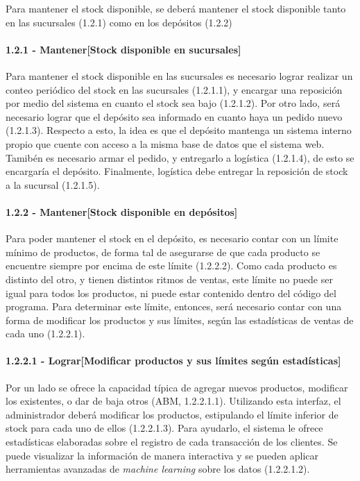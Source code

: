 Para mantener el stock disponible, se deberá mantener el stock disponible tanto
en las sucursales (1.2.1) como en los depósitos (1.2.2)

\paragraph{1.2.1 - Mantener[Stock disponible en sucursales]} \label{para:1.2.1}

Para mantener el stock disponible en las sucursales es necesario lograr realizar
un conteo periódico del stock en las sucursales (1.2.1.1), y encargar una
reposición por medio del sistema en cuanto el stock sea bajo (1.2.1.2). Por otro
lado, será necesario lograr que el depósito sea informado en cuanto haya un
pedido nuevo (1.2.1.3). Respecto a esto, la idea es que el depósito mantenga un
sistema interno propio que cuente con acceso a la misma base de datos que el
sistema web. Tamibén es necesario armar el pedido, y entregarlo a logística
(1.2.1.4), de esto se encargaría el depósito. Finalmente, logística debe
entregar la reposición de stock a la sucursal (1.2.1.5).

\paragraph{1.2.2 - Mantener[Stock disponible en depósitos]} \label{para:1.2.2}

Para poder mantener el stock en el depósito, es necesario contar con un límite
mínimo de productos, de forma tal de asegurarse de que cada producto se
encuentre siempre por encima de este límite (1.2.2.2). Como cada producto es
distinto del otro, y tienen distintos ritmos de ventas, este límite no puede ser
igual para todos los productos, ni puede estar contenido dentro del código del
programa. Para determinar este límite, entonces, será necesario contar con una
forma de modificar los productos y sus límites, según las estadísticas de ventas
de cada uno (1.2.2.1).

\paragraph{1.2.2.1 - Lograr[Modificar productos y sus límites según estadísticas]} \label{para:1.2.2.1}

Por un lado se ofrece la capacidad típica de agregar nuevos productos, modificar
los existentes, o dar de baja otros (ABM, 1.2.2.1.1). Utilizando esta interfaz,
el administrador deberá modificar los productos, estipulando el límite inferior
de stock para cada uno de ellos (1.2.2.1.3). Para ayudarlo, el sistema le ofrece
estadísticas elaboradas sobre el registro de cada transacción de los clientes.
Se puede visualizar la información de manera interactiva y se pueden aplicar
herramientas avanzadas de \textit{machine learning} sobre los datos (1.2.2.1.2).

